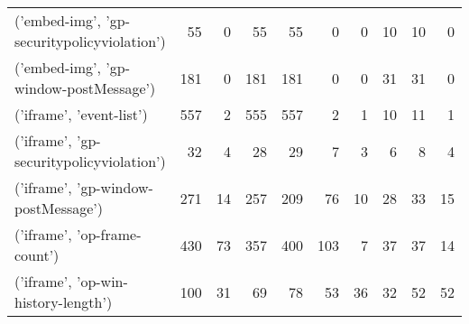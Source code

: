 \begin{tabular}{lrrrrrrrrr}
 ('embed-img', 'gp-securitypolicyviolation') &                               55 &                                  0 &                                     55 &                           55 &                           0 &                                   0 &                                     10 &                            10 &                            0 \\
      ('embed-img', 'gp-window-postMessage') &                              181 &                                  0 &                                    181 &                          181 &                           0 &                                   0 &                                     31 &                            31 &                            0 \\
                    ('iframe', 'event-list') &                              557 &                                  2 &                                    555 &                          557 &                           2 &                                   1 &                                     10 &                            11 &                            1 \\
    ('iframe', 'gp-securitypolicyviolation') &                               32 &                                  4 &                                     28 &                           29 &                           7 &                                   3 &                                      6 &                             8 &                            4 \\
         ('iframe', 'gp-window-postMessage') &                              271 &                                 14 &                                    257 &                          209 &                          76 &                                  10 &                                     28 &                            33 &                           15 \\
                ('iframe', 'op-frame-count') &                              430 &                                 73 &                                    357 &                          400 &                         103 &                                   7 &                                     37 &                            37 &                           14 \\
         ('iframe', 'op-win-history-length') &                              100 &                                 31 &                                     69 &                           78 &                          53 &                                  36 &                                     32 &                            52 &                           52 \\

\end{tabular}
